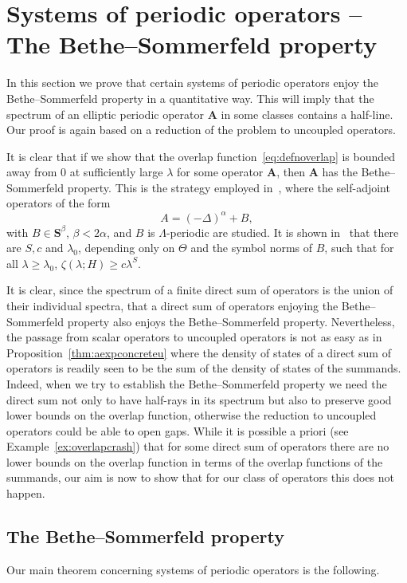 \documentclass[10pt]{amsart}
\theoremstyle{definition}\newtheorem{defi}[theo]{Definition}\newtheorem{rema}[theo]{Remark}\newtheorem{exam}[theo]{Example}\newtheorem{nota}[theo]{Notation}
\newcommand{\BA}{\mathbf A}
\newcommand{\BS}{\mathbf S}
\begin{document}
\section{Systems of periodic operators -- The Bethe--Sommerfeld property}\label{sec:bs}


In this section we prove that certain systems of periodic operators enjoy the Bethe--Sommerfeld property in a quantitative way. This will imply that the spectrum of an elliptic periodic operator $\BA$ in some classes contains a half-line. Our proof is again based on a reduction of the problem to uncoupled operators.

It is clear that if we show that the overlap function~\eqref{eq:defnoverlap} is bounded away from $0$ at sufficiently large $\lambda$ for some operator $\BA$, then $\BA$ has the Bethe--Sommerfeld property. This is the strategy employed in~\cite{ParSob2010}, where the self-adjoint operators of the form
\begin{equation}
A = (-\Delta)^\alpha + B,
\end{equation}
with $B\in \BS^\beta$, $\beta < 2\alpha$, and $B$ is $\Lambda$-periodic are studied. It is shown in~\cite{ParSob2010} that there are $S, c$ and $\lambda_0$, depending only on $\Theta$ and the symbol norms of $B$, such that for all $\lambda \ge \lambda_0$, $\zeta(\lambda;H) \ge c
\lambda^S$.

It is clear, since the spectrum of a finite direct sum of operators is the union of their individual spectra, that a direct sum of operators enjoying the Bethe--Sommerfeld property also enjoys the Bethe--Sommerfeld property. Nevertheless, the passage from scalar operators to uncoupled operators is not as easy as in Proposition~\ref{thm:aexpconcreteu} where the density of states of a direct sum of operators is readily seen to be the sum of the density of states of the summands. Indeed, when we try to establish the Bethe--Sommerfeld property we need the direct sum not only to have half-rays in its spectrum but also to preserve good lower bounds on the overlap function, otherwise the reduction to uncoupled operators could be able to open gaps. While it is possible a priori (see Example~\ref{ex:overlapcrash}) that for some direct sum of operators there are no lower bounds on the overlap function in terms of the overlap functions of the summands, our aim is now to show that for our class of operators this does not happen.

\subsection{The Bethe--Sommerfeld property} Our main theorem concerning systems of periodic operators is the following.
\end{document}
